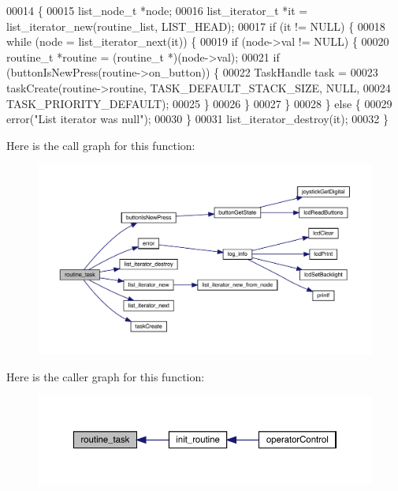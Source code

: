 \begin{DoxyCode}
00014                     \{
00015   list_node_t *node;
00016   list_iterator_t *it = list_iterator_new(routine_list, LIST_HEAD);
00017   \textcolor{keywordflow}{if} (it != NULL) \{
00018     \textcolor{keywordflow}{while} (node = list_iterator_next(it)) \{
00019       \textcolor{keywordflow}{if} (node->val != NULL) \{
00020         routine_t *routine = (routine_t *)(node->val);
00021         \textcolor{keywordflow}{if} (buttonIsNewPress(routine->on_button)) \{
00022           TaskHandle task =
00023               taskCreate(routine->routine, TASK\_DEFAULT\_STACK\_SIZE, NULL,
00024                          TASK\_PRIORITY\_DEFAULT);
00025         \}
00026       \}
00027     \}
00028   \} \textcolor{keywordflow}{else} \{
00029     error(\textcolor{stringliteral}{"List iterator was null"});
00030   \}
00031   list_iterator_destroy(it);
00032 \}
\end{DoxyCode}
Here is the call graph for this function\+:
\nopagebreak
\begin{figure}[H]
\begin{center}
\leavevmode
\includegraphics[width=350pt]{routines_8c_a230cdcefb410a429fb6baba1f88fc9ba_cgraph}
\end{center}
\end{figure}
Here is the caller graph for this function\+:
\nopagebreak
\begin{figure}[H]
\begin{center}
\leavevmode
\includegraphics[width=350pt]{routines_8c_a230cdcefb410a429fb6baba1f88fc9ba_icgraph}
\end{center}
\end{figure}


